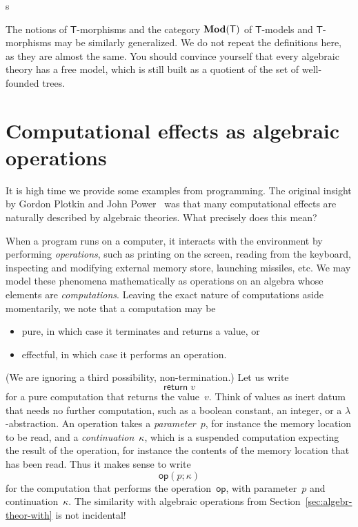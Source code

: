s\documentclass{amsart}
\newcommand{\theory}[1]{\mathsf{#1}} %
\newcommand{\Mod}[1]{\text{\textbf{Mod}}(\theory{#1})} %
\newcommand{\kode}[1]{\mathsf{#1}}
\newcommand{\opcall}[3]{\kode{#1}(#2; #3)}
\newcommand{\return}[1]{\kode{return}\;#1}
\begin{document}
The notions of $\theory{T}$-morphisms and the category $\Mod{T}$ of
$\theory{T}$-models and $\theory{T}$-morphisms may be similarly generalized. We
do not repeat the definitions here, as they are almost the same. You should
convince yourself that every algebraic theory has a free model, which is still
built as a quotient of the set of well-founded trees.

\section{Computational effects as algebraic operations}
\label{sec:comp-effects-as}

It is high time we provide some examples from programming. The original insight
by Gordon Plotkin and John Power~\cite{plotkin-power} was that many
computational effects are naturally described by algebraic theories. What
precisely does this mean?

When a program runs on a computer, it interacts with the environment by
performing \emph{operations}, such as printing on the screen, reading from the
keyboard, inspecting and modifying external memory store, launching missiles,
etc. We may model these phenomena mathematically as operations on an algebra
whose elements are \emph{computations}. Leaving the exact nature of computations
aside momentarily, we note that a computation may be
%
\begin{itemize}
\item pure, in which case it terminates and returns a value, or
\item effectful, in which case it performs an operation.
\end{itemize}
%
(We are ignoring a third possibility, non-termination.) Let us write
%
\begin{equation*}
  \return{v}
\end{equation*}
%
for a pure computation that returns the value~$v$. Think of values as inert
datum that needs no further computation, such as a boolean constant, an integer,
or a $\lambda$-abstraction. An operation takes a \emph{parameter}~$p$, for
instance the memory location to be read, and a \emph{continuation}~$\kappa$,
which is a suspended computation expecting the result of the operation, for
instance the contents of the memory location that has been read. Thus it makes
sense to write
%
\begin{equation*}
  \opcall{op}{p}{\kappa}
\end{equation*}
%
for the computation that performs the operation~$\kode{op}$, with parameter~$p$
and continuation~$\kappa$. The similarity with algebraic operations from
Section~\ref{sec:algebr-theor-with} is not incidental!
\end{document}
